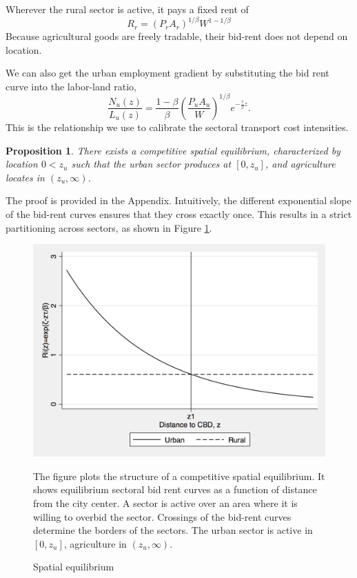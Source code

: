 \documentclass[12pt]{article}
\newtheorem{proposition}{Proposition}
\begin{document}
Wherever the rural sector is active, it pays a fixed rent of
\[
R_r = (P_rA_r)^{1/\beta} W^{1-1/\beta}
\]
Because agricultural goods are freely tradable, their bid-rent does not depend on location.

We can also get the urban employment gradient by substituting the bid rent curve into the labor-land ratio,
\begin{equation}
\label{eq:EmpGrad}
\frac{N_u(z)}{L_u(z)} = \frac{1-\beta}{\beta} \left(\frac{P_uA_u}{W}\right)^{1/\beta} e^{-\frac{\tau}{\beta} z}.
\end{equation}
This is the relationship we use to calibrate the sectoral transport cost intensities.

\begin{proposition}\label{prop:existence}
There exists a competitive spatial equilibrium, characterized by location $0<z_u$ such that the urban sector produces at $\left[0,z_u\right]$, and agriculture locates in $(z_u,\infty)$.
\end{proposition}
The proof is provided in the Appendix. Intuitively, the different exponential slope of the bid-rent curves ensures that they cross exactly once. This results in a strict partitioning across sectors, as shown in Figure \ref{fig:BidRent}.

\begin{figure}[h!]
\caption{Spatial equilibrium\label{fig:BidRent}}
\begin{center}
\includegraphics[scale=0.4]{figures/bid_rent_curves}
\end{center}

\noindent \footnotesize{The figure plots the structure of a competitive spatial equilibrium. It shows equilibrium sectoral bid rent curves as a function of distance from the city center. A sector is active over an area where it is willing to overbid the sector. Crossings of the bid-rent curves determine the borders of the sectors. The urban sector is active in $[0,z_u]$, agriculture in $(z_u,\infty)$.}
\end{figure}
\end{document}
